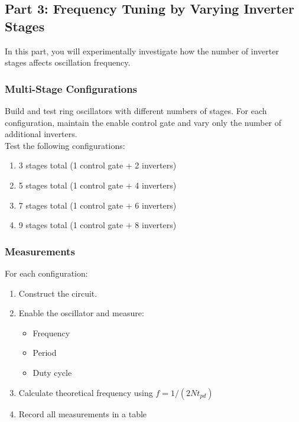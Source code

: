 \documentclass[10pt]{article}
\begin{document}
\subsection{Part 3: Frequency Tuning by Varying Inverter Stages}

In this part, you will experimentally investigate how the number of inverter stages affects oscillation frequency.

\subsubsection{Multi-Stage Configurations}

Build and test ring oscillators with different numbers of stages.  For each configuration, maintain the enable control gate and vary only the number of additional inverters. \\

Test the following configurations:
\begin{enumerate}
    \item 3 stages total (1 control gate + 2 inverters)
    \item 5 stages total (1 control gate + 4 inverters)
    \item 7 stages total (1 control gate + 6 inverters)
    \item 9 stages total (1 control gate + 8 inverters)
\end{enumerate}

\subsubsection{Measurements}

For each configuration: 
\begin{enumerate}
    \item Construct the circuit.
    
    \item Enable the oscillator and measure: 
    \begin{itemize}
        \item Frequency 
        \item Period
        \item Duty cycle
    \end{itemize}
    
    \item Calculate theoretical frequency using $f = 1/(2Nt_{pd})$
    
    \item Record all measurements in a table
\end{enumerate}
\end{document}
